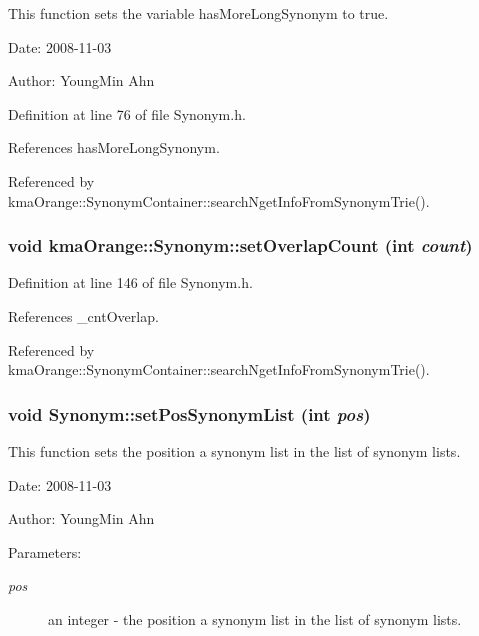 This function sets the variable hasMoreLongSynonym to true. 

\begin{Desc}
\item[Date:]2008-11-03 \end{Desc}
\begin{Desc}
\item[Author:]YoungMin Ahn \end{Desc}


Definition at line 76 of file Synonym.h.

References hasMoreLongSynonym.

Referenced by kmaOrange::SynonymContainer::searchNgetInfoFromSynonymTrie().\hypertarget{classkmaOrange_1_1Synonym_c95ea384c1e83ee8ae95239fa571d035}{
\subsubsection[{setOverlapCount}]{\setlength{\rightskip}{0pt plus 5cm}void kmaOrange::Synonym::setOverlapCount (int {\em count})}}
\label{classkmaOrange_1_1Synonym_c95ea384c1e83ee8ae95239fa571d035}




Definition at line 146 of file Synonym.h.

References \_\-cntOverlap.

Referenced by kmaOrange::SynonymContainer::searchNgetInfoFromSynonymTrie().\hypertarget{classkmaOrange_1_1Synonym_5ce7eeebcb9e7ad3f0749cebffbe5465}{
\subsubsection[{setPosSynonymList}]{\setlength{\rightskip}{0pt plus 5cm}void Synonym::setPosSynonymList (int {\em pos})}}
\label{classkmaOrange_1_1Synonym_5ce7eeebcb9e7ad3f0749cebffbe5465}


This function sets the position a synonym list in the list of synonym lists. 

\begin{Desc}
\item[Date:]2008-11-03 \end{Desc}
\begin{Desc}
\item[Author:]YoungMin Ahn \end{Desc}
\begin{Desc}
\item[Parameters:]
\begin{description}
\item[{\em pos}]an integer - the position a synonym list in the list of synonym lists. \end{description}
\end{Desc}


